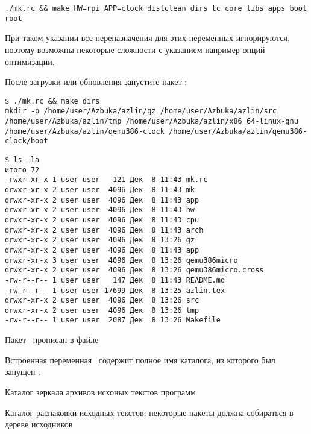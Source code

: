 \begin{verbatim}
./mk.rc && make HW=rpi APP=clock distclean dirs tc core libs apps boot root
\end{verbatim}

При таком указании все переназначения для этих переменных игнорируются, поэтому
возможны некоторые сложности с указанием например опций оптимизации.

 \label{azdirs}

После загрузки или обновления запустите пакет :

\begin{verbatim}
$ ./mk.rc && make dirs
mkdir -p /home/user/Azbuka/azlin/gz /home/user/Azbuka/azlin/src
/home/user/Azbuka/azlin/tmp /home/user/Azbuka/azlin/x86_64-linux-gnu
/home/user/Azbuka/azlin/qemu386-clock /home/user/Azbuka/azlin/qemu386-clock/boot
\end{verbatim}
\begin{verbatim}
$ ls -la
итого 72
-rwxr-xr-x 1 user user   121 Дек  8 11:43 mk.rc
drwxr-xr-x 2 user user  4096 Дек  8 11:43 mk
drwxr-xr-x 2 user user  4096 Дек  8 11:43 app
drwxr-xr-x 2 user user  4096 Дек  8 11:43 hw
drwxr-xr-x 2 user user  4096 Дек  8 11:43 cpu
drwxr-xr-x 2 user user  4096 Дек  8 11:43 arch
drwxr-xr-x 2 user user  4096 Дек  8 13:26 gz
drwxr-xr-x 2 user user  4096 Дек  8 11:43 app
drwxr-xr-x 3 user user  4096 Дек  8 13:26 qemu386micro
drwxr-xr-x 2 user user  4096 Дек  8 13:26 qemu386micro.cross
-rw-r--r-- 1 user user   147 Дек  8 11:43 README.md
-rw-r--r-- 1 user user 17699 Дек  8 13:25 azlin.tex
drwxr-xr-x 2 user user  4096 Дек  8 13:26 src
drwxr-xr-x 2 user user  4096 Дек  8 13:26 tmp
-rw-r--r-- 1 user user  2087 Дек  8 13:26 Makefile
\end{verbatim}

Пакет \ прописан в файле


Встроенная переменная \ содержит полное имя каталога, из которого был
запущен .

\bigskip
Каталог зеркала архивов исхоных текстов программ


Каталог распаковки исходных текстов: некоторые пакеты должна собираться в дереве
исходников


